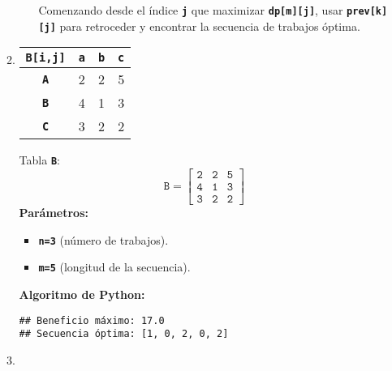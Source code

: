 \begin{enumerate}[label=\color{red}\textbf{\arabic*)}]
\begin{enumerate}[label=\color{red}\alph*)]
\begin{enumerate}[label=\arabic*)]
                    Comenzando desde el índice \textbf{\texttt{j}} que maximizar \textbf{\texttt{dp[m][j]}}, usar \textbf{\texttt{prev[k][j]}} para retroceder y encontrar la secuencia de trabajos óptima.
                  \end{enumerate}
                \item {}
                
\begin{center}
\color{blue}
                                \begin{tabular}{|c|c|c|c|}
        \hline
        \textbf{\texttt{B[i,j]}} & \textbf{\texttt{a}} & \textbf{\texttt{b}} & \textbf{\texttt{c}} \\ \hline
        \textbf{\texttt{A}}  & 2 & 2 & 5\\ \hline
        \textbf{\texttt{B}}  & 4 & 1 & 3\\ \hline
        \textbf{\texttt{C}}  & 3 & 2 & 2\\ \hline
\end{tabular}
\end{center}

Tabla \textbf{\texttt{B}}: \[
\mathbf{\mathtt{B=\begin{bmatrix} 
      2 & 2 & 5\\
      4 & 1 & 3\\
      3 & 2 & 2
\end{bmatrix} }}
\]  
\textbf{Parámetros:}
\begin{itemize}[label=\textbullet]
  \item \textbf{\texttt{n=3}} (número de trabajos).
  \item \textbf{\texttt{m=5}} (longitud de la secuencia).
\end{itemize}

\textbf{Algoritmo de Python:}


\begin{verbatim}
## Beneficio máximo: 17.0
## Secuencia óptima: [1, 0, 2, 0, 2]
\end{verbatim}
                \item {} 


\end{enumerate}
\end{enumerate}
